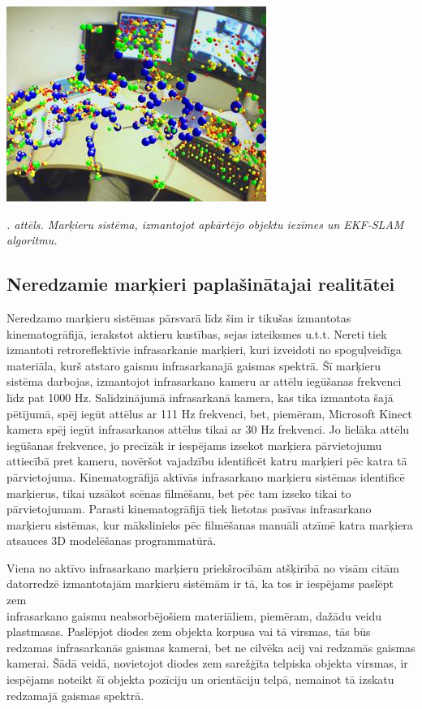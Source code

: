 \documentclass[12pt, a4paper, oneside, openright]{article}
\renewcommand{\thecimages}{\arabic{cimages}}
\begin{document}
\label{cimages:a3}
\vspace{10pt}
\begin{samepage}
\begin{center}
\includegraphics[width=0.5\columnwidth]{images/a3.png}
\begin{center}
\footnotesize{
\textit{\thecimages. attēls. Marķieru sistēma, izmantojot apkārtējo objektu iezīmes un EKF-SLAM algoritmu.}}
\end{center}
\end{center}
\end{samepage}

\newpage
\subsection{Neredzamie marķieri paplašinātajai realitātei}

\par
Neredzamo marķieru sistēmas pārsvarā līdz šim ir tikušas izmantotas kinematogrāfijā, ierakstot
aktieru kustības, sejas izteiksmes u.t.t. Nereti tiek izmantoti retroreflektīvie infrasarkanie
marķieri, kuri izveidoti no spoguļveidīga materiāla, kurš atstaro gaismu infrasarkanajā gaismas spektrā. 
Šī marķieru sistēma darbojas, izmantojot infrasarkano kameru ar attēlu iegūšanas frekvenci līdz pat 1000 Hz.
Salīdzinājumā infrasarkanā kamera, kas tika izmantota šajā pētījumā, spēj iegūt attēlus ar 111 Hz frekvenci, bet,
piemēram, Microsoft Kinect kamera spēj iegūt infrasarkanos attēlus tikai ar 30 Hz frekvenci. 
Jo lielāka attēlu iegūšanas frekvence, jo precīzāk ir iespējams izsekot marķiera pārvietojumu attiecībā pret
kameru, novēršot vajadzību identificēt katru marķieri pēc katra tā \\ pārvietojuma.
Kinematogrāfijā aktīvās infrasarkano marķieru sistēmas identificē marķierus, tikai uzsākot scēnas filmēšanu,
bet pēc tam izseko tikai to pārvietojumam. Parasti kinematogrāfijā tiek lietotas pasīvas infrasarkano marķieru sistēmas,
kur mākslinieks pēc filmēšanas manuāli atzīmē katra marķiera atsauces 3D modelēšanas programmatūrā.
\par 
Viena no aktīvo infrasarkano marķieru priekšrocībām atšķirībā no visām citām \\ datorredzē izmantotajām 
marķieru sistēmām ir tā, ka tos ir iespējams paslēpt zem \\ infrasarkano gaismu neabsorbējošiem materiāliem,
piemēram, dažādu veidu plastmasas. Paslēpjot diodes zem objekta korpusa vai tā virsmas, tās būs
redzamas infrasarkanās gaismas kamerai, bet ne cilvēka acij vai redzamās gaismas kamerai.
Šādā veidā, novietojot diodes zem sarežģīta telpiska objekta virsmas, ir iespējams noteikt šī objekta
pozīciju un orientāciju telpā, nemainot tā izskatu redzamajā gaismas spektrā.
\end{document}
